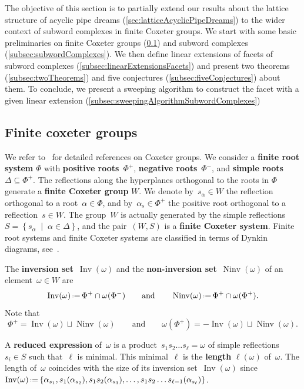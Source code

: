 \documentclass[reqno]{amsart}
\theoremstyle{definition}
\newcommand{\set}[2]{\left\{ #1 \;\middle|\; #2 \right\}} %
\newcommand{\eqdef}{\mbox{\,\raisebox{0.2ex}{\scriptsize\ensuremath{\mathrm:}}\ensuremath{=}\,}} %
\DeclareMathOperator{\Inv}{Inv} %
\DeclareMathOperator{\Ninv}{Ninv} %
\newcommand{\defn}[1]{\textbf{\textsf{\color{PineGreen} #1}}} %
\begin{document}
The objective of this section is to partially extend our results about the lattice structure of acyclic pipe dreams (\cref{sec:latticeAcyclicPipeDreams}) to the wider context of subword complexes in finite Coxeter groups.
We start with some basic preliminaries on finite Coxeter groups (\cref{subsec:finiteCoxeterGroups}) and subword complexes (\cref{subsec:subwordComplexes}).
We then define linear extensions of facets of subword complexes (\cref{subsec:linearExtensionsFacets}) and present two theorems (\cref{subsec:twoTheorems}) and five conjectures (\cref{subsec:fiveConjectures}) about them.
To conclude, we present a sweeping algorithm to construct the facet with a given linear extension (\cref{subsec:sweepingAlgorithmSubwordComplexes})


\subsection{Finite coxeter groups} 
\label{subsec:finiteCoxeterGroups}

We refer to~\cite{BjornerBrenti, Humphreys} for detailed references on Coxeter groups. 
We consider a \defn{finite root system} $\Phi$ with \defn{positive roots}~$\Phi^+$, \defn{negative roots}~$\Phi^-$, and \defn{simple roots} $\Delta \subseteq \Phi^+$.
The reflections along the hyperplanes orthogonal to the roots in $\Phi$ generate a \defn{finite Coxeter group} $W$.
We denote by~$s_\alpha \in W$ the reflection orthogonal to a root~$\alpha \in \Phi$, and by~$\alpha_s \in \Phi^+$ the positive root orthogonal to a reflection~$s \in W$.
The group~$W$ is actually generated by the simple reflections~$S = \set{s_\alpha}{\alpha \in \Delta}$, and the pair~$(W,S)$ is a \defn{finite Coxeter system}.
Finite root systems and finite Coxeter systems are classified in terms of Dynkin diagrams, see~\cite{Humphreys}. 

The \defn{inversion set}~$\Inv(\omega)$ and the \defn{non-inversion set}~$\Ninv(\omega)$ of an element~$\omega \in W$ are
\[
\Inv(\omega) \eqdef \Phi^+ \cap \omega(\Phi^-)
\qquad\text{and}\qquad
\Ninv(\omega) \eqdef \Phi^+ \cap \omega(\Phi^+).
\]
Note that
\[
\Phi^+ = \Inv(\omega) \sqcup \Ninv(\omega)
\qquad\text{and}\qquad
\omega(\Phi^+) = -\Inv(\omega) \sqcup \Ninv(\omega).
\]

A \defn{reduced expression} of~$\omega$ is a product~$s_1 s_2 \dots s_\ell = \omega$ of simple reflections~$s_i \in S$ such that~$\ell$ is minimal.
This minimal~$\ell$ is the \defn{length} $\ell(\omega)$ of~$\omega$.
The length of~$\omega$ coincides with the size of its inversion set~$\Inv(\omega)$ since $\Inv(\omega) \eqdef \{\alpha_{s_1}, s_1(\alpha_{s_2}), s_1s_2(\alpha_{s_3}), \dots, s_1s_2 \dots s_{\ell-1}(\alpha_{s_\ell})\}$.
\end{document}
